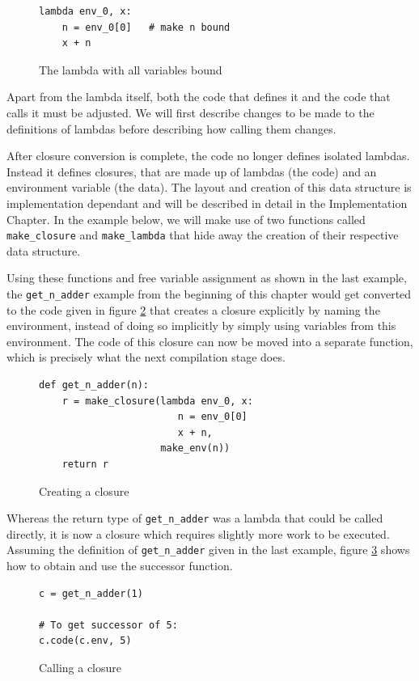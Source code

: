 \documentclass[11pt]{report}
\begin{document}
\begin{figure}[ht]
\begin{lstlisting}
lambda env_0, x: 
    n = env_0[0]   # make n bound
    x + n
\end{lstlisting}
\caption{The lambda with all variables bound}
\label{cc5}
\end{figure}

Apart from the lambda itself, both the code that defines it and the code that calls it must be adjusted. We will first describe changes to be made to the definitions of lambdas before describing how calling them changes.

After closure conversion is complete, the code no longer defines isolated lambdas. Instead it defines closures, that are made up of lambdas (the code) and an environment variable (the data). The layout and creation of this data structure is implementation dependant and will be described in detail in the Implementation Chapter. In the example below, we will make use of two functions called \texttt{make_closure} and \texttt{make_lambda} that hide away the creation of their respective data structure.

Using these functions and free variable assignment as shown in the last example, the \texttt{get_n_adder} example from the beginning of this chapter would get converted to the code given in figure \ref{cc6} that creates a closure explicitly by naming the environment, instead of doing so implicitly by simply using variables from this environment. The code of this closure can now be moved into a separate function, which is precisely what the next compilation stage does.

\begin{figure}[ht]
\begin{lstlisting}
def get_n_adder(n):
    r = make_closure(lambda env_0, x: 
                        n = env_0[0]
                        x + n, 
                     make_env(n))
    return r
\end{lstlisting}
\caption{Creating a closure}
\label{cc6}
\end{figure}

Whereas the return type of \texttt{get_n_adder} was a lambda that could be called directly, it is now a closure which requires slightly more work to be executed. Assuming the definition of \texttt{get_n_adder} given in the last example, figure \ref{cc7} shows how to obtain and use the successor function.

\begin{figure}[ht]
\begin{lstlisting}
c = get_n_adder(1)

# To get successor of 5:
c.code(c.env, 5)
\end{lstlisting}
\caption{Calling a closure}
\label{cc7}
\end{figure}
\end{document}
